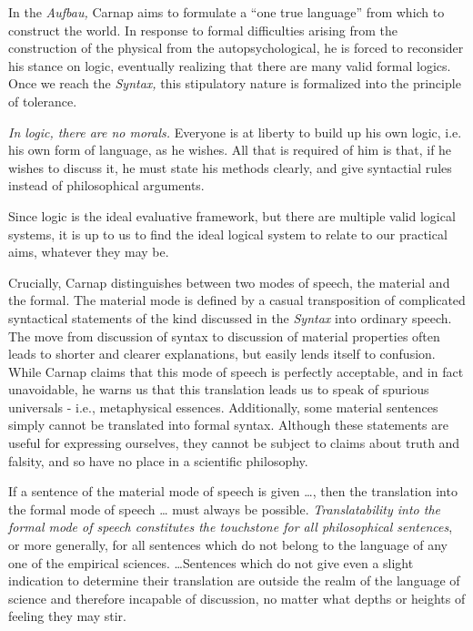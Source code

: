 \documentclass[leqno, 12pt]{turabian-researchpaper}
\begin{document}
	In the \textit{Aufbau,} Carnap aims to formulate a \enquote{one true language}
	from which to construct the world. In response to formal difficulties arising
	from the construction of the physical from the autopsychological, he is forced
	to reconsider his stance on logic, eventually realizing that there are many
	valid formal logics. Once we reach the \textit{Syntax,} this stipulatory
	nature is formalized into the principle of tolerance.
	\begin{displayquote}
		 \emph{In logic, there are no morals.}
		Everyone is at liberty to build up his own logic, i.e. his own form of
		language, as he wishes. All that is required of him is that, if he wishes to
		discuss it, he must state his methods clearly, and give syntactial rules instead
		of philosophical arguments.
	\end{displayquote}
	Since logic is the ideal evaluative framework, but there are multiple valid
	logical systems, it is up to us to find the ideal logical system to relate to our
	practical aims, whatever they may be.

	Crucially, Carnap distinguishes between two modes of speech, the material and
	the formal. The material mode is defined by a casual transposition of complicated
	syntactical statements of the kind discussed in the \textit{Syntax} into
	ordinary speech. The move from discussion of syntax to discussion of material properties
	often leads to shorter and clearer explanations, but easily lends itself to
	confusion. While Carnap claims that this mode of speech is perfectly acceptable,
	and in fact unavoidable, he warns us that this translation leads us to speak of
	spurious universals - i.e., metaphysical essences. Additionally, some material
	sentences simply cannot be translated into formal syntax. Although these
	statements are useful for expressing ourselves, they cannot be subject to claims
	about truth and falsity, and so have no place in a scientific philosophy.

	\begin{displayquote}
		 If a sentence of the material mode of speech
		is given \dots, then the translation into the formal mode of speech \dots
		must always be possible. \emph{Translatability into the formal mode of
		speech constitutes the touchstone for all philosophical sentences}, or more generally,
		for all sentences which do not belong to the language of any one of the
		empirical sciences. \dots Sentences which do not give even a slight indication
		to determine their translation are outside the realm of the language of science
		and therefore incapable of discussion, no matter what depths or heights of
		feeling they may stir.
	\end{displayquote}
\end{document}
